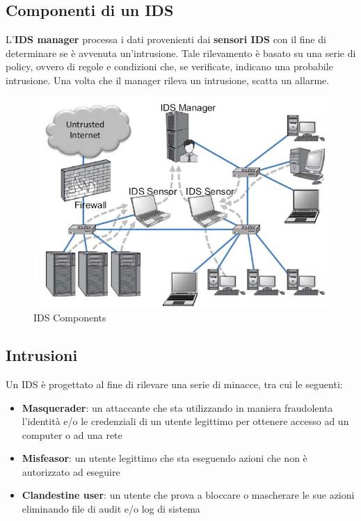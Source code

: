 \subsection{Componenti di un IDS}
L'\textbf{IDS manager} processa i dati provenienti dai \textbf{sensori IDS} con il fine di determinare se è avvenuta un'intrusione. Tale rilevamento è basato su una serie di policy, ovvero di regole e condizioni che, se verificate, indicano una probabile intrusione. Una volta che il manager rileva un intrusione, scatta un allarme.

\begin{figure}[htbp]
	\centering
	\includegraphics[width=0.5\linewidth]{Immagini/firewalls/IDS.png}
	\caption{IDS Components} 	
	\label{fig:IDS_components}
\end{figure}

\subsection{Intrusioni}
Un IDS è progettato al fine di rilevare una serie di minacce, tra cui le seguenti:

\begin{itemize}
\item \textbf{Masquerader}: un attaccante che sta utilizzando in maniera fraudolenta l'identità e/o le credenziali di un utente legittimo per ottenere accesso ad un computer o ad una rete
\item \textbf{Misfeasor}: un utente legittimo che sta eseguendo azioni che non è autorizzato ad eseguire
\item \textbf{Clandestine user}: un utente che prova a bloccare o mascherare le sue azioni eliminando file di audit e/o log di sistema
\end{itemize}

